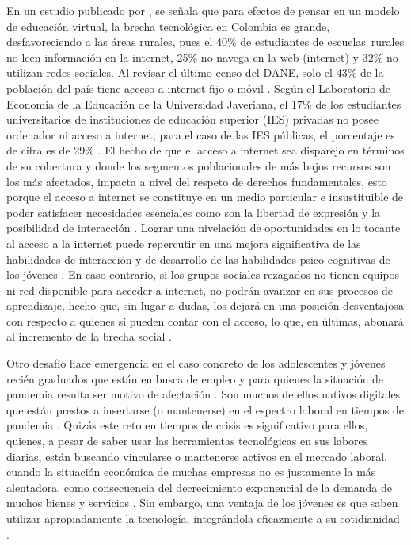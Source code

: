 \documentclass[spanish]{textolivre}
\begin{document}
En un estudio publicado por \textcite{hernandez2017}, se señala que para efectos de pensar en un modelo de educación virtual, la brecha tecnológica en Colombia es grande, desfavoreciendo  a las áreas rurales, pues el 40\% de estudiantes de escuelas rurales no leen información en la internet, 25\% no navega en la web (internet) y 32\% no utilizan redes sociales. Al revisar el último censo del DANE, solo el 43\% de la población del país tiene acceso a internet fijo o móvil \cite{lopez2020}. Según el Laboratorio de Economía de la Educación de la Universidad Javeriana, el 17\% de los estudiantes universitarios de instituciones de educación superior (IES) privadas no posee ordenador ni acceso a internet; para el caso de las IES públicas, el porcentaje es de cifra es de 29\% \cite{lopez2020}. El hecho de que el acceso a internet sea disparejo en términos de su cobertura y donde los segmentos poblacionales de más bajos recursos son los más afectados, impacta a nivel del respeto de derechos fundamentales, esto porque el acceso a internet se constituye en un medio particular e insustituible de poder satisfacer necesidades esenciales como son la libertad de expresión y la posibilidad de interacción \cite{reglitz2020}. Lograr una nivelación de oportunidades en lo tocante al acceso a la internet puede repercutir en una mejora significativa de las habilidades de interacción y de desarrollo de las habilidades psico-cognitivas de los jóvenes \cite{castellar2011}. En caso contrario, si los grupos sociales rezagados no tienen equipos ni red disponible para acceder a internet, no podrán avanzar en sus procesos de aprendizaje, hecho que, sin lugar a dudas, los dejará en una posición desventajosa con respecto a quienes sí pueden contar con el acceso, lo que, en últimas, abonará al incremento de la brecha social \cite{lopez2020}.

Otro desafío hace emergencia en el caso concreto de los adolescentes y jóvenes recién graduados que están en busca de empleo y para quienes la situación de pandemia resulta ser motivo de afectación \cite{blustein2020}. Son muchos de ellos nativos digitales que están prestos a insertarse (o mantenerse) en el espectro laboral en tiempos de pandemia \cite{montenovo2020}. Quizás este reto en tiempos de crisis es significativo para ellos, quienes, a pesar de saber usar las herramientas tecnológicas en sus labores diarias, están buscando vincularse o mantenerse activos en el mercado laboral, cuando la situación económica de muchas empresas no es justamente la más alentadora, como consecuencia del decrecimiento exponencial de la demanda de muchos bienes y servicios \cite{gregory2020}. Sin embargo, una ventaja de los jóvenes es que saben utilizar apropiadamente la tecnología, integrándola eficazmente a su cotidianidad \cite{bennett2008}.
\end{document}
